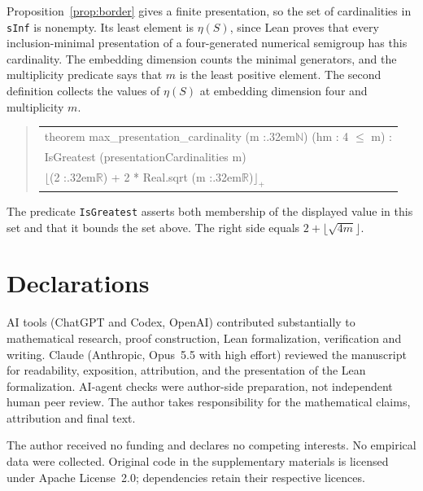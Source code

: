 \documentclass[11pt]{article}
\theoremstyle{definition}
\theoremstyle{remark}
\theoremstyle{plain}
\begin{document}
Proposition~\ref{prop:border} gives a finite presentation, so the set
of cardinalities in \texttt{sInf} is nonempty. Its least element is
$\eta(S)$, since Lean proves that every inclusion-minimal presentation
of a four-generated numerical semigroup has this cardinality.
The embedding dimension counts the minimal generators, and the
multiplicity predicate says that $m$ is the least positive element.
The second definition collects the values of $\eta(S)$ at embedding
dimension four and multiplicity $m$.

\begin{quote}\small\ttfamily
\begin{tabular}{@{}l@{}}
\hspace*{0em}theorem max\_presentation\_cardinality (m :\kern.32em\(\mathbb N\)) (hm : 4 \(\le\) m) :\\
\hspace*{2em}IsGreatest (presentationCardinalities m)\\
\hspace*{3em}\(\lfloor\)(2 :\kern.32em\(\mathbb R\)) + 2 * Real.sqrt (m :\kern.32em\(\mathbb R\))\(\rfloor_+\)
\end{tabular}
\end{quote}

The predicate \texttt{IsGreatest} asserts both membership of the displayed
value in this set and that it bounds the set above. The right side equals
$2+\lfloor\sqrt{4m}\rfloor$.

\section*{Declarations}
AI tools (ChatGPT and Codex, OpenAI) contributed substantially to
mathematical research, proof construction, Lean formalization,
verification and writing. Claude (Anthropic, Opus~5.5 with high effort)
reviewed the manuscript for readability, exposition, attribution, and
the presentation of the Lean formalization.
AI-agent checks were author-side preparation,
not independent human peer review. The author takes responsibility for the mathematical claims, attribution
and final text.

The author received no funding and declares no competing interests.
No empirical data were collected. Original code in the supplementary
materials is licensed under Apache License~2.0; dependencies retain
their respective licences.
\end{document}
